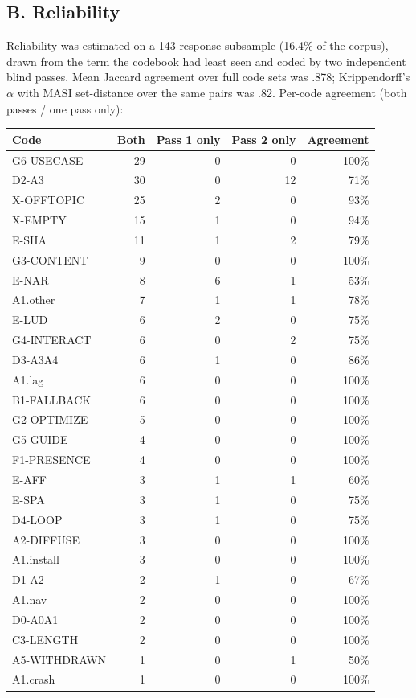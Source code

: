 \subsection*{B. Reliability}

Reliability was estimated on a 143-response subsample (16.4\% of the corpus),
drawn from the term the codebook had least seen and coded by two independent
blind passes. Mean Jaccard agreement over full code sets was .878;
Krippendorff's $\alpha$ with MASI set-distance over the same pairs was .82.
Per-code agreement (both passes / one pass only):

\begin{center}
\begin{tabular}{lrrrr}
\hline
Code & Both & Pass 1 only & Pass 2 only & Agreement \\
\hline
G6-USECASE & 29 & 0 & 0 & 100\% \\
D2-A3 & 30 & 0 & 12 & 71\% \\
X-OFFTOPIC & 25 & 2 & 0 & 93\% \\
X-EMPTY & 15 & 1 & 0 & 94\% \\
E-SHA & 11 & 1 & 2 & 79\% \\
G3-CONTENT & 9 & 0 & 0 & 100\% \\
E-NAR & 8 & 6 & 1 & 53\% \\
A1.other & 7 & 1 & 1 & 78\% \\
E-LUD & 6 & 2 & 0 & 75\% \\
G4-INTERACT & 6 & 0 & 2 & 75\% \\
D3-A3A4 & 6 & 1 & 0 & 86\% \\
A1.lag & 6 & 0 & 0 & 100\% \\
B1-FALLBACK & 6 & 0 & 0 & 100\% \\
G2-OPTIMIZE & 5 & 0 & 0 & 100\% \\
G5-GUIDE & 4 & 0 & 0 & 100\% \\
F1-PRESENCE & 4 & 0 & 0 & 100\% \\
E-AFF & 3 & 1 & 1 & 60\% \\
E-SPA & 3 & 1 & 0 & 75\% \\
D4-LOOP & 3 & 1 & 0 & 75\% \\
A2-DIFFUSE & 3 & 0 & 0 & 100\% \\
A1.install & 3 & 0 & 0 & 100\% \\
D1-A2 & 2 & 1 & 0 & 67\% \\
A1.nav & 2 & 0 & 0 & 100\% \\
D0-A0A1 & 2 & 0 & 0 & 100\% \\
C3-LENGTH & 2 & 0 & 0 & 100\% \\
A5-WITHDRAWN & 1 & 0 & 1 & 50\% \\
A1.crash & 1 & 0 & 0 & 100\% \\
\hline
\end{tabular}
\end{center}

